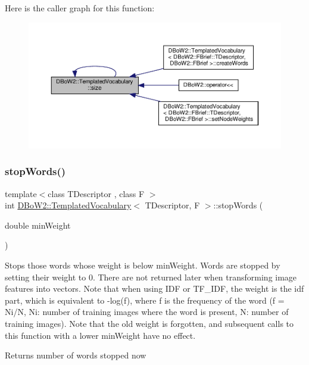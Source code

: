 Here is the caller graph for this function\+:\nopagebreak
\begin{figure}[H]
\begin{center}
\leavevmode
\includegraphics[width=350pt]{classDBoW2_1_1TemplatedVocabulary_a8baad280d6daf74ee43d7cd911363137_icgraph}
\end{center}
\end{figure}
\mbox{\label{classDBoW2_1_1TemplatedVocabulary_a0b6721fde54bd8cd008f6a120398741e}} 
\subsubsection{\texorpdfstring{stop\+Words()}{stopWords()}}
{\footnotesize\ttfamily template$<$class T\+Descriptor , class F $>$ \\
int \hyperlink{classDBoW2_1_1TemplatedVocabulary}{D\+Bo\+W2\+::\+Templated\+Vocabulary}$<$ T\+Descriptor, F $>$\+::stop\+Words (\begin{DoxyParamCaption}\item[{double}]{min\+Weight }\end{DoxyParamCaption})\hspace{0.3cm}{\ttfamily [virtual]}}

Stops those words whose weight is below min\+Weight. Words are stopped by setting their weight to 0. There are not returned later when transforming image features into vectors. Note that when using I\+DF or T\+F\+\_\+\+I\+DF, the weight is the idf part, which is equivalent to -\/log(f), where f is the frequency of the word (f = Ni/N, Ni\+: number of training images where the word is present, N\+: number of training images). Note that the old weight is forgotten, and subsequent calls to this function with a lower min\+Weight have no effect. \begin{DoxyReturn}{Returns}
number of words stopped now 
\end{DoxyReturn}


